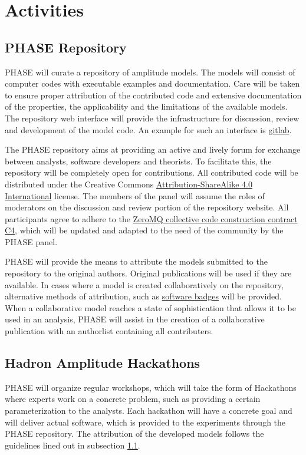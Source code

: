 \section{Activities}

\subsection{PHASE Repository}
\label{sec:repo}
PHASE will curate a repository of amplitude models. The models will consist of computer codes with executable examples and documentation. Care will be taken to ensure proper attribution of the contributed code and extensive documentation of the properties, the applicability and the limitations of the available models. The repository web interface will provide the infrastructure for discussion, review and development of the model code. An example for such an interface is \href{https://about.gitlab.com/}{gitlab}. 

The PHASE repository aims at providing an active and lively forum for exchange between analysts, software developers and theorists. To facilitate this, the repository will be completely open for contributions. All contributed code will be distributed under the Creative Commons
\href{https://creativecommons.org/licenses/by-sa/4.0/}{Attribution-ShareAlike 4.0 International} license. The members of the panel will assume the roles of moderators on the discussion and review portion of the repository website. All participants agree to adhere to the \href{https://rfc.zeromq.org/spec:42/C4/}{ZeroMQ collective code construction contract C4}, which will be updated and adapted to the need of the community by the PHASE panel.

PHASE will provide the means to attribute the models submitted to the repository to the original authors. Original publications will be used if they are available. In cases where a model is created collaboratively on the repository, alternative methods of attribution, such as \href{http://openbadges.org}{software badges} will be provided. When a collaborative model reaches a state of sophistication that allows it to be used in an analysis, PHASE will assist in the creation of a collaborative publication with an authorlist containing all contributers.

\subsection{Hadron Amplitude Hackathons}
\label{sec:hackathon}
PHASE will organize regular workshops, which will take the form of Hackathons where experts work on a concrete problem, such as providing a certain parameterization to the analysts. Each hackathon will have a concrete goal and will deliver actual software, which is provided to the experiments through the PHASE repository. The attribution of the developed models follows the guidelines lined out in subsection \ref{sec:repo}.

